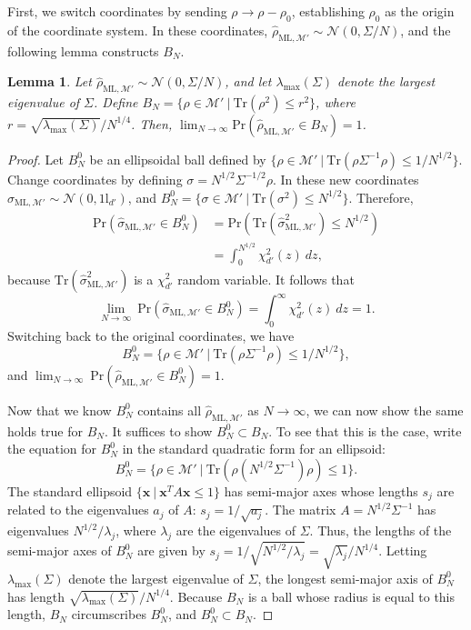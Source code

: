 \documentclass[aps,pra, twocolumn]{revtex4-1}
\newcommand{\M}{\mathcal{M}}
\newcommand{\Id}{\mathbb{I}}
\def\Id{1\!\mathrm{l}}
\newcommand{\rhohat}{\hat{\rho}}
\newcommand{\rhoML}[1]{\rhohat_{\scriptscriptstyle{\mathrm{ML},#1}}}
\newtheorem{lem}{Lemma}
\begin{document}
First, we switch coordinates by sending $\rho \rightarrow \rho - \rho_{0}$, establishing $\rho_{0}$ as the origin of the coordinate system. In these coordinates, $\rhoML{\M'} \sim \mathcal{N}(0, \Sigma/N)$, and the following lemma constructs $B_{N}$.

\begin{lem}
\label{eq:lem}
Let $\rhoML{\M'} \sim \mathcal{N}(0, \Sigma/N)$, and let $\lambda_{\max}(\Sigma)$ denote the largest eigenvalue of $\Sigma$. Define $B_{N} = \{\rho \in \M' ~|~\mathrm{Tr}(\rho^{2}) \leq r^{2}\}$, where $r = \sqrt{\lambda_{\max}(\Sigma)}/N^{1/4}$. Then, $\lim_{N \rightarrow \infty} \mathrm{Pr}(\rhoML{\M'} \in B_{N}) =1$.
\end{lem}

\begin{proof}
Let $B^{0}_{N}$ be an ellipsoidal ball defined by $\{\rho \in \M'~|~\mathrm{Tr}(\rho \Sigma^{-1} \rho) \leq 1/N^{1/2}\}$. Change coordinates by defining $\sigma = N^{1/2}\Sigma^{-1/2}\rho$. In these new coordinates $\hat{\sigma}_{\mathrm{ML},\M'} \sim \mathcal{N}(0, \Id_{d'})$, and $B^{0}_{N} = \{\sigma \in \M'~|~\mathrm{Tr}(\sigma^{2}) \leq N^{1/2}\}$. Therefore,
\begin{align*}
\mathrm{Pr}(\hat{\sigma}_{\mathrm{ML},\M'} \in B^{0}_{N}) &= \mathrm{Pr}(\mathrm{Tr}(\hat{\sigma}_{\mathrm{ML},\M'}^{2}) \leq N^{1/2})\\
&= \int_{0}^{N^{1/2}}\chi^{2}_{d'}(z)~dz,
\end{align*}
because $\mathrm{Tr}(\hat{\sigma}_{\mathrm{ML},\M'}^{2})$ is a $\chi^{2}_{d'}$ random variable. It follows that
\[\lim_{N \rightarrow \infty}~\mathrm{Pr}(\hat{\sigma}_{\mathrm{ML},\M'} \in B^{0}_{N})  =\int_{0}^{\infty}\chi^{2}_{d'}(z)~dz =1.\]
Switching back to the original coordinates, we have
\[B^{0}_{N} = \{\rho \in \M'~|~\mathrm{Tr}(\rho \Sigma^{-1} \rho) \leq 1/N^{1/2}\},\]
and $\lim_{N \rightarrow \infty}~\mathrm{Pr}(\rhoML{\M'} \in B^{0}_{N}) = 1$.

Now that we know $B^{0}_{N}$ contains all  $\rhoML{\M'}$ as $N\rightarrow \infty$, we can now show the same holds true for $B_{N}$. It suffices to show $B^{0}_{N} \subset B_{N}$. To see that this is the case, write the equation for $B^{0}_{N}$ in the standard quadratic form for an ellipsoid:
\[B^{0}_{N} = \{\rho \in \M'~|~\mathrm{Tr}(\rho ( N^{1/2}\Sigma^{-1} ) \rho) \leq 1\}.\]
The standard ellipsoid $\{\mathbf{x}~|~\mathbf{x}^{T}A\mathbf{x} \leq 1\}$ has semi-major axes whose lengths $s_{j}$ are related to the eigenvalues $a_{j}$ of $A$: $s_{j} = 1/\sqrt{a_{j}}$. The matrix $A = N^{1/2}\Sigma^{-1}$ has eigenvalues $N^{1/2}/\lambda_{j}$, where $\lambda_{j}$ are the eigenvalues of $\Sigma$. Thus, the lengths of the semi-major axes of $B^{0}_{N}$ are given by $s_{j} = 1/\sqrt{N^{1/2}/\lambda_{j}} = \sqrt{\lambda_{j}}/N^{1/4}$. Letting $\lambda_{\max}(\Sigma)$ denote the largest eigenvalue of $\Sigma$, the longest semi-major axis of $B^{0}_{N}$ has length $\sqrt{\lambda_{\max}(\Sigma)}/N^{1/4}$.
Because $B_{N}$ is a ball whose radius is equal to this length, $B_{N}$ circumscribes $B^{0}_{N}$, and $B^{0}_{N} \subset B_{N}$.


\end{proof}
\end{document}
